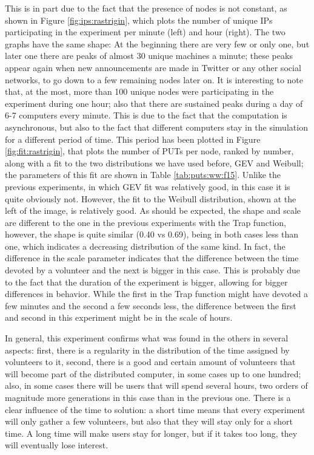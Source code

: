 \documentclass{sig-alternate}
\begin{document}
This is in part due to the fact that the presence of nodes is not
constant, as shown in Figure \ref{fig:ips:rastrigin}, which plots the
number of unique IPs participating in the experiment per minute (left)
and hour (right). The two graphs have the same shape: At the beginning there are very few or only
one, but later one there are peaks of almost 30 unique machines a
minute; these peaks appear again when new announcements are made in
Twitter or any other social networks, to go down to a few remaining
nodes later on. It is interesting to note that, at the most, more than
100 unique nodes were participating in the experiment during one hour;
also that there are sustained peaks during a day of 6-7 computers
every minute. This is due to the fact that the computation is
asynchronous, but also to the fact that different computers stay in
the simulation for a different period of time. This period has been
plotted in Figure \ref{fig:fit:rastrigin}, that plots the number of
PUTs per node, ranked by number, along with a fit to the two
distributions we have used before, GEV and Weibull; the parameters of
this fit are shown in Table \ref{tab:puts:ww:f15}. Unlike the previous
experiments, in which GEV fit was relatively good, in this case it is
quite obviously not. However, the fit to the Weibull distribution,
shown at the left of the image, is relatively good. As should be
expected, the shape and scale are different to the one in the previous
experiments with the Trap function, however, the shape is quite
similar (0.40 vs 0.69), being in both cases less than one, which
indicates a decreasing distribution of the same kind. In fact, the
difference in the scale parameter indicates that the difference
between the time devoted by a volunteer and the next is bigger in this
case. This is probably due to the fact that the duration of the
experiment is bigger, allowing for bigger differences in
behavior. While the first in the Trap function might have devoted a
few minutes and the second a few seconds less, the difference between
the first and second in this experiment might be in the scale of
hours. 


In general, this experiment confirms what was found in the others in
several aspects: first, there is a regularity in the distribution of the
time assigned by volunteers to it, second, there is a good and certain
amount of volunteers that will become part of the distributed
computer, in some cases up to one hundred; also, in some cases there
will be users that will spend several hours, two orders of magnitude
more generations in this case than in the previous one.
There is a clear influence of the time to solution: a short time means that every
experiment will only gather a few volunteers, but also that they will
stay only for a short time. A long time will make users stay for
longer, but if it takes too long, they will eventually lose interest. 
\end{document}
